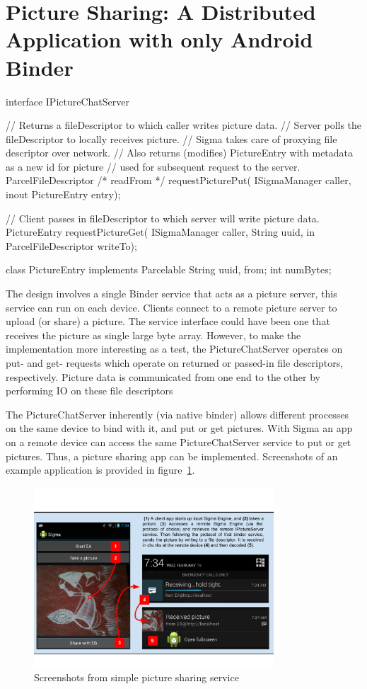 \documentclass[prodmode]{acmlarge}
\begin{document}
\section{Picture Sharing: A Distributed Application with only Android Binder}
\label{sec:ExampleApplication}
\begin{snippet}
interface IPictureChatServer {
  // Returns a fileDescriptor to which caller writes picture data.
  // Server polls the fileDescriptor to locally receives picture.
  // Sigma takes care of proxying file descriptor over network.
  // Also returns (modifies) PictureEntry with metadata as a new id for picture
  // used for subsequent request to the server.
  ParcelFileDescriptor /* readFrom */ requestPicturePut(
    ISigmaManager caller, inout PictureEntry entry);

  // Client passes in fileDescriptor to which server will write picture data.
  PictureEntry requestPictureGet(
    ISigmaManager caller, String uuid, in ParcelFileDescriptor writeTo);
}

class PictureEntry implements Parcelable {
    String uuid, from;
    int numBytes;
}
\end{snippet}

The design involves a single Binder service that acts as a picture server, this service can run on each device. Clients connect to a remote picture server to upload (or share) a picture. The service interface could have been one that receives the picture as single large byte array. However, to make the implementation more interesting as a test, the PictureChatServer operates on put- and get- requests which operate on returned or passed-in file descriptors, respectively. Picture data is communicated from one end to the other by performing IO on these file descriptors

The PictureChatServer inherently (via native binder) allows different processes on the same device to bind with it, and put or get pictures. With Sigma an app on a remote device can access the same PictureChatServer service to put or get pictures. Thus, a picture sharing app can be implemented. Screenshots of an example application is provided in figure~\ref{fig:ExampleApplication}.

\begin{figure}[h]
\centering
\includegraphics[width=0.8\textwidth]{drawings/PictureChatExample.pdf}
\caption{Screenshots from simple picture sharing service}
\label{fig:ExampleApplication}
\end{figure}
\end{document}

